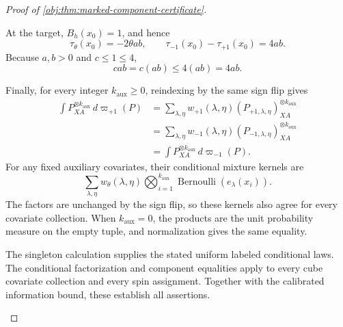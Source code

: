 \documentclass[11pt]{article}
\begin{document}
\begin{proof}[Proof of \cref{obj:thm:marked-component-certificate}]
\begin{enumerate}
At the target, \(B_h(x_0)=1\), and hence
\[
\tau_\theta(x_0)=-2\theta ab,
\qquad
\tau_{-1}(x_0)-\tau_{+1}(x_0)=4ab.
\]
Because \(a,b>0\) and \(c\le1\le4\),
\[
cab=c(ab)\le4(ab)=4ab.
\]

Finally, for every integer \(k_{\mathrm{aux}}\ge0\), reindexing by the same sign flip gives
\[
\begin{aligned}
\int P_{XA}^{\otimes k_{\mathrm{aux}}}\,d\varpi_{+1}(P)
&=
\sum_{\lambda,\eta}
w_{+1}(\lambda,\eta)
(P_{+1,\lambda,\eta})_{XA}^{\otimes k_{\mathrm{aux}}}\\
&=
\sum_{\lambda,\eta}
w_{-1}(\lambda,\eta)
(P_{-1,\lambda,\eta})_{XA}^{\otimes k_{\mathrm{aux}}}\\
&=
\int P_{XA}^{\otimes k_{\mathrm{aux}}}\,d\varpi_{-1}(P).
\end{aligned}
\]
For any fixed auxiliary covariates, their conditional mixture kernels are
\[
\sum_{\lambda,\eta}
w_\theta(\lambda,\eta)
\bigotimes_{i=1}^{k_{\mathrm{aux}}}
\operatorname{Bernoulli}(e_\lambda(x_i)).
\]
The factors are unchanged by the sign flip, so these kernels also agree for every covariate collection. When \(k_{\mathrm{aux}}=0\), the products are the unit probability measure on the empty tuple, and normalization gives the same equality.

The singleton calculation supplies the stated uniform labeled conditional laws. The conditional factorization and component equalities apply to every cube covariate collection and every spin assignment. Together with the calibrated information bound, these establish all assertions.
\end{enumerate}
\end{proof}
\end{document}
